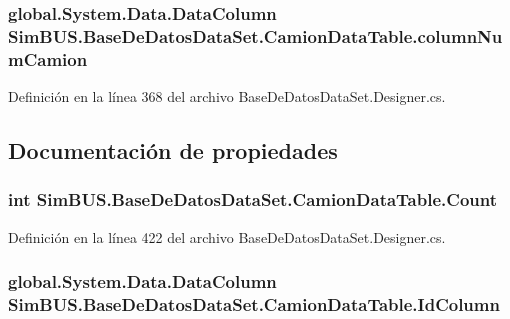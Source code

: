 \subsubsection[{column\-Num\-Camion}]{\setlength{\rightskip}{0pt plus 5cm}global.\-System.\-Data.\-Data\-Column Sim\-B\-U\-S.\-Base\-De\-Datos\-Data\-Set.\-Camion\-Data\-Table.\-column\-Num\-Camion\hspace{0.3cm}{\ttfamily [private]}}\label{class_sim_b_u_s_1_1_base_de_datos_data_set_1_1_camion_data_table_a042e46a3fdb5255654648a5630c8130d}


Definición en la línea 368 del archivo Base\-De\-Datos\-Data\-Set.\-Designer.\-cs.



\subsection{Documentación de propiedades}
\subsubsection[{Count}]{\setlength{\rightskip}{0pt plus 5cm}int Sim\-B\-U\-S.\-Base\-De\-Datos\-Data\-Set.\-Camion\-Data\-Table.\-Count\hspace{0.3cm}{\ttfamily [get]}}\label{class_sim_b_u_s_1_1_base_de_datos_data_set_1_1_camion_data_table_a5d6e38073e485b92729765df12098dcc}


Definición en la línea 422 del archivo Base\-De\-Datos\-Data\-Set.\-Designer.\-cs.

\subsubsection[{Id\-Column}]{\setlength{\rightskip}{0pt plus 5cm}global.\-System.\-Data.\-Data\-Column Sim\-B\-U\-S.\-Base\-De\-Datos\-Data\-Set.\-Camion\-Data\-Table.\-Id\-Column\hspace{0.3cm}{\ttfamily [get]}}\label{class_sim_b_u_s_1_1_base_de_datos_data_set_1_1_camion_data_table_a4e2d09e8e0b8f6cbb2d72418d98cfe28}


